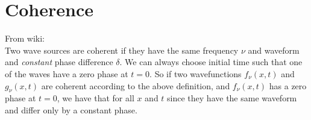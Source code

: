  \section{Coherence}
 From wiki:\\
 Two wave sources are coherent if they have the same frequency $\nu$ and waveform and \emph{constant} phase difference
 $\delta$. We can always choose initial time such that one of the waves have a zero phase at $t=0$.
 So if two wavefunctions $f_\nu(x, t)$ and $g_\nu(x,t)$ are coherent according to the above definition, and $f_\nu(x,t)$
 has a zero phase at $t=0$, we have that for all $x$ and $t$
 since they have the same waveform and differ only by a constant phase.